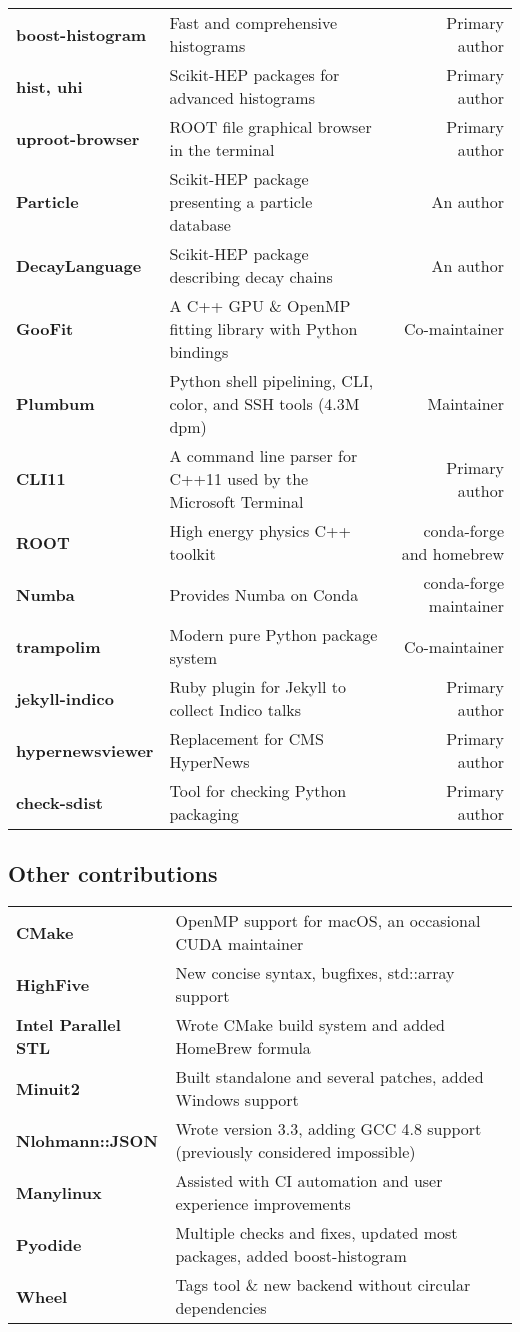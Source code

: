 \documentclass[10pt,letterpaper]{moderncv}
\begin{document}
\begin{tabularx}{\textwidth}{>{\bfseries}p{1.2in}Xr}
    boost-histogram & Fast and comprehensive histograms & Primary author \\
    hist, uhi & Scikit-HEP packages for advanced histograms & Primary author \\
    uproot-browser & ROOT file graphical browser in the terminal & Primary author \\
	Particle & Scikit-HEP package presenting a particle database & An author \\
	DecayLanguage & Scikit-HEP package describing decay chains & An author \\
    GooFit & A C++ GPU \& OpenMP fitting library with Python bindings & Co-maintainer \\
    Plumbum & Python shell pipelining, CLI, color, and SSH tools (4.3M dpm) & Maintainer \\
	CLI11 & A command line parser for C++11 used by the Microsoft Terminal & Primary author \\
	ROOT & High energy physics C++ toolkit & conda-forge and homebrew \\
	Numba & Provides Numba on Conda & conda-forge maintainer \\
	trampolim & Modern pure Python package system & Co-maintainer \\
    jekyll-indico & Ruby plugin for Jekyll to collect Indico talks & Primary author \\
    hypernewsviewer & Replacement for CMS HyperNews & Primary author \\
    check-sdist & Tool for checking Python packaging & Primary author \\
\end{tabularx}

\subsection{Other contributions}
\begin{tabularx}{\textwidth}{>{\bfseries}p{1.4in}X}
	CMake          & OpenMP support for macOS, an occasional CUDA maintainer  \\
	HighFive       & New concise syntax, bugfixes, std::array support  \\
	Intel Parallel STL & Wrote CMake build system and added HomeBrew formula \\
	Minuit2        & Built standalone and several patches, added Windows support \\
	Nlohmann::JSON & Wrote version 3.3, adding GCC 4.8 support (previously considered impossible) \\
    Manylinux      & Assisted with CI automation and user experience improvements \\
    Pyodide        & Multiple checks and fixes, updated most packages, added boost-histogram \\
    Wheel          & Tags tool \& new backend without circular dependencies \\
\end{tabularx}
\end{document}
